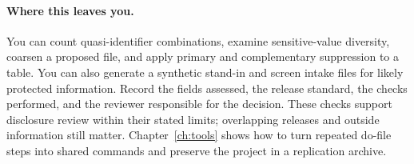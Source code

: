 \documentclass[
    a4paper,
    fontsize=10pt,
    twoside=true,
    numbers=noenddot,
]{kaobook}
\begin{document}
\paragraph{Where this leaves you.} You can count quasi-identifier combinations, examine sensitive-value diversity, coarsen a proposed file, and apply primary and complementary suppression to a table. You can also generate a synthetic stand-in and screen intake files for likely protected information. Record the fields assessed, the release standard, the checks performed, and the reviewer responsible for the decision. These checks support disclosure review within their stated limits; overlapping releases and outside information still matter. Chapter~\ref{ch:tools} shows how to turn repeated do-file steps into shared commands and preserve the project in a replication archive.
\end{document}

